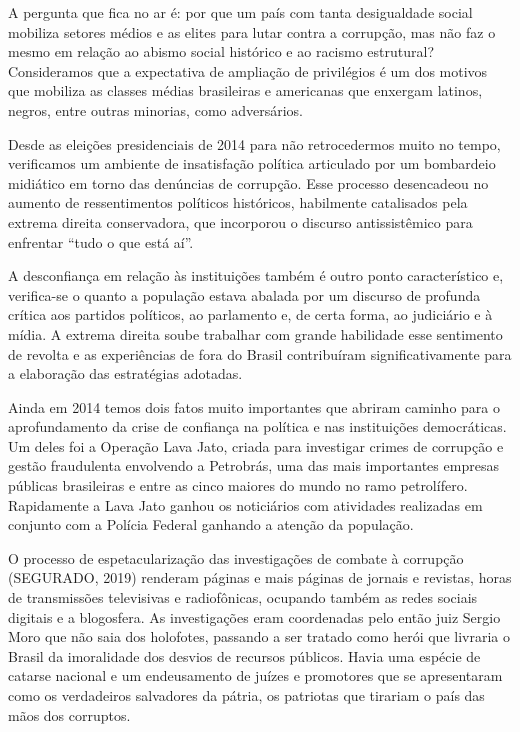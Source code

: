 A pergunta que fica no ar é: por que um país com tanta desigualdade
social mobiliza setores médios e as elites para lutar contra a
corrupção, mas não faz o mesmo em relação ao abismo social histórico e
ao racismo estrutural? Consideramos que a expectativa de ampliação de
privilégios é um dos motivos que mobiliza as classes médias brasileiras
e americanas que enxergam latinos, negros, entre outras minorias, como
adversários.

Desde as eleições presidenciais de 2014 para não retrocedermos muito no
tempo, verificamos um ambiente de insatisfação política articulado por
um bombardeio midiático em torno das denúncias de corrupção. Esse
processo desencadeou no aumento de ressentimentos políticos históricos,
habilmente catalisados pela extrema direita conservadora, que incorporou
o discurso antissistêmico para enfrentar ``tudo o que está aí''.

A desconfiança em relação às instituições também é outro ponto
característico e, verifica-se o quanto a população estava abalada por um
discurso de profunda crítica aos partidos políticos, ao parlamento e, de
certa forma, ao judiciário e à mídia. A extrema direita soube trabalhar
com grande habilidade esse sentimento de revolta e as experiências de
fora do Brasil contribuíram significativamente para a elaboração das
estratégias adotadas.

Ainda em 2014 temos dois fatos muito importantes que abriram caminho
para o aprofundamento da crise de confiança na política e nas
instituições democráticas. Um deles foi a Operação Lava Jato, criada
para investigar crimes de corrupção e gestão fraudulenta envolvendo a
Petrobrás, uma das mais importantes empresas públicas brasileiras e
entre as cinco maiores do mundo no ramo petrolífero. Rapidamente a Lava
Jato ganhou os noticiários com atividades realizadas em conjunto com a
Polícia Federal ganhando a atenção da população.

O processo de espetacularização das investigações de combate à corrupção
(SEGURADO, 2019) renderam páginas e mais páginas de jornais e revistas,
horas de transmissões televisivas e radiofônicas, ocupando também as
redes sociais digitais e a blogosfera. As investigações eram coordenadas
pelo então juiz Sergio Moro que não saia dos holofotes, passando a ser
tratado como herói que livraria o Brasil da imoralidade dos desvios de
recursos públicos. Havia uma espécie de catarse nacional e um
endeusamento de juízes e promotores que se apresentaram como os
verdadeiros salvadores da pátria, os patriotas que tirariam o país das
mãos dos corruptos.

